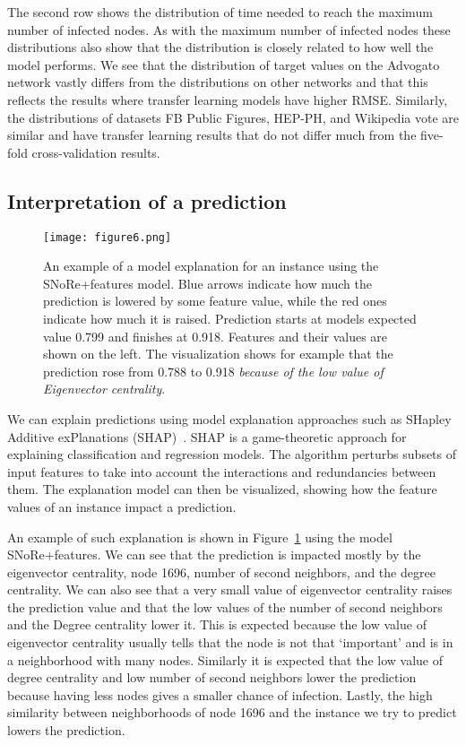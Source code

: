 \documentclass{article}
\begin{document}
The second row shows the distribution of time needed to reach the maximum number of infected nodes. As with the maximum number of infected nodes these distributions also show that the distribution is closely related to how well the model performs. We see that the distribution of target values on the Advogato network vastly differs from the distributions on other networks and that this reflects the results where transfer learning models have higher RMSE. Similarly, the distributions of datasets FB Public Figures, HEP-PH, and Wikipedia vote are similar and have transfer learning results that do not differ much from the five-fold cross-validation results. 

\subsection{Interpretation of a prediction}

\begin{figure}[h!]
  \centering
  \texttt{[image: figure6.png]}
  \caption{An example of a model explanation for an instance using the SNoRe+features model. Blue arrows indicate how much the prediction is lowered by some feature value, while the red ones indicate how much it is raised. Prediction starts at models expected value 0.799 and finishes at 0.918. Features and their values are shown on the left. The visualization shows for example that the prediction rose from 0.788 to 0.918 \emph{because of the low value of Eigenvector centrality}.}
  \label{fig:shap}
\end{figure}

We can explain predictions using model explanation approaches such as SHapley Additive exPlanations (SHAP)~\cite{lundberg2017shap,vstrumbelj2014explaining}. SHAP is a game-theoretic approach for explaining classification and regression models. The algorithm perturbs subsets of input features to take into account the interactions and redundancies between them. The explanation model can then be visualized, showing how the feature values of an instance impact a prediction.

An example of such explanation is shown in Figure~\ref{fig:shap} using the model SNoRe+features. We can see that the prediction is impacted mostly by the eigenvector centrality, node 1696, number of second neighbors, and the degree centrality. We can also see that a very small value of eigenvector centrality raises the prediction value and that the low values of the number of second neighbors and the Degree centrality lower it. This is expected because the low value of eigenvector centrality usually tells that the node is not that `important' and is in a neighborhood with many nodes. Similarly it is expected that the low value of degree centrality and low number of second neighbors lower the prediction because having less nodes gives a smaller chance of infection. Lastly, the high similarity between neighborhoods of node 1696 and the instance we try to predict lowers the prediction.
\end{document}

